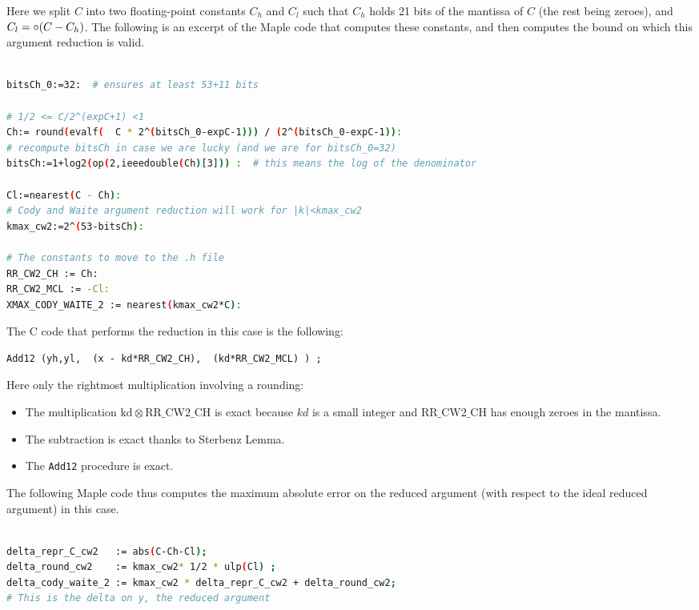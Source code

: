 Here we split $C$ into two floating-point constants $C_h$ and $C_l$
such that $C_h$ holds 21 bits of the mantissa of $C$ (the rest being
zeroes), and $C_l=\circ(C-C_h)$.  The following is an excerpt of the
Maple code that computes these constants, and then computes the
bound on which this argument reduction is valid.

\begin{lstlisting}[caption={Maple script for computing constants for Cody and Waite 2},
  firstnumber=1,  language={sh}, numbers=none]% of course it's maple
%Skip a line here, I don't know why, otherwise latex eats the first line

bitsCh_0:=32:  # ensures at least 53+11 bits

# 1/2 <= C/2^(expC+1) <1
Ch:= round(evalf(  C * 2^(bitsCh_0-expC-1))) / (2^(bitsCh_0-expC-1)):
# recompute bitsCh in case we are lucky (and we are for bitsCh_0=32)
bitsCh:=1+log2(op(2,ieeedouble(Ch)[3])) :  # this means the log of the denominator

Cl:=nearest(C - Ch):
# Cody and Waite argument reduction will work for |k|<kmax_cw2
kmax_cw2:=2^(53-bitsCh):

# The constants to move to the .h file
RR_CW2_CH := Ch:
RR_CW2_MCL := -Cl:
XMAX_CODY_WAITE_2 := nearest(kmax_cw2*C):
\end{lstlisting}

The C code that performs the reduction in this case is the following:

\begin{lstlisting}[caption={Cody and Waite argument reduction with two
    constants},firstnumber=31]
	Add12 (yh,yl,  (x - kd*RR_CW2_CH),  (kd*RR_CW2_MCL) ) ;
\end{lstlisting}

Here only the rightmost multiplication involving a rounding: 
\begin{itemize}
\item The multiplication $\mathrm{kd}\otimes \mathrm{RR\_CW2\_CH}$ is
  exact because $kd$ is a small integer and $\mathrm{RR\_CW2\_CH}$
  has enough zeroes in the mantissa.
\item The subtraction is exact thanks to Sterbenz Lemma.
\item The \texttt{Add12} procedure is exact.
\end{itemize}

The following Maple code thus computes the maximum absolute error on
the reduced argument (with respect to the ideal reduced argument) in
this case.
\begin{lstlisting}[caption={Maple script for computing absolute error for Cody and Waite 2},
  firstnumber=1,  language={sh}, numbers=none]% of course it's maple

delta_repr_C_cw2   := abs(C-Ch-Cl);
delta_round_cw2    := kmax_cw2* 1/2 * ulp(Cl) ;
delta_cody_waite_2 := kmax_cw2 * delta_repr_C_cw2 + delta_round_cw2;
# This is the delta on y, the reduced argument
\end{lstlisting}


